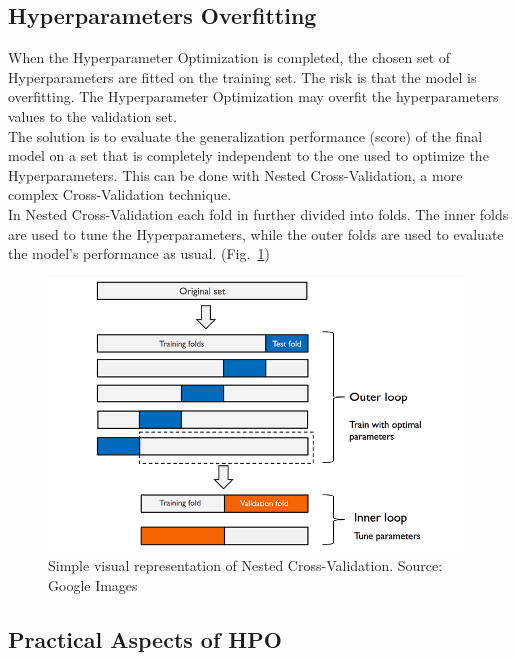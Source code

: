 \subsection{Hyperparameters Overfitting}

When the Hyperparameter Optimization is completed, the chosen set of Hyperparameters are fitted on the training set.
The risk is that the model is overfitting. The Hyperparameter Optimization may overfit the hyperparameters values to the validation set.
% 
\\[0.3cm]The solution is to evaluate the generalization performance (score) of the final model on a set that is completely independent to the one used to optimize the Hyperparameters.
This can be done with Nested Cross-Validation, a more complex Cross-Validation technique.
\\[0.3cm]In Nested Cross-Validation each fold in further divided into folds. The inner folds are used to tune the Hyperparameters, while the outer folds are used to evaluate the model's performance as usual. (Fig.~\ref{fig:figure-2.4.4})
\begin{figure}[t]
	\centering
	\includegraphics[width=11cm]{figures/figure-2.4.4.png}
	\caption[Nested Cross-Validation Visualized]{Simple visual representation of Nested Cross-Validation. Source: Google Images}
	\label{fig:figure-2.4.4}
\end{figure}

\subsection{Practical Aspects of HPO}


